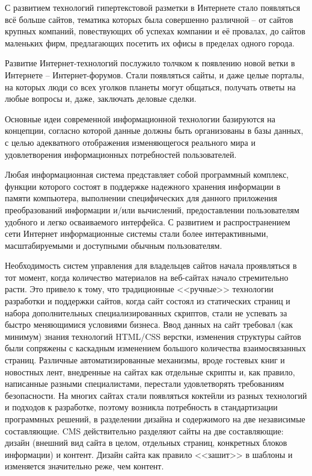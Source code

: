 С развитием технологий гипертекстовой разметки в Интернете стало появляться всё больше сайтов, тематика которых была совершенно различной – от сайтов крупных компаний, повествующих об успехах компании и её провалах, до сайтов маленьких фирм, предлагающих посетить их офисы в пределах одного города.

Развитие Интернет-технологий послужило толчком к появлению новой ветки в Интернете -- Интернет-форумов. Стали появляться сайты, и даже целые порталы, на которых люди со всех уголков планеты могут общаться, получать ответы на любые вопросы и, даже, заключать деловые сделки.

Основные идеи современной информационной технологии базируются на концепции, согласно которой данные должны быть организованы в базы данных, с целью адекватного отображения изменяющегося реального мира и удовлетворения информационных потребностей пользователей.

Любая информационная система представляет собой программный комплекс, функции которого состоят в поддержке надежного хранения информации в памяти компьютера, выполнении специфических для данного приложения преобразований информации и/или вычислений, предоставлении пользователям удобного и легко осваиваемого интерфейса. С развитием и распространением сети Интернет информационные системы стали более интерактивными, масштабируемыми и доступными обычным пользователям.

Необходимость систем управления для владельцев сайтов начала проявляться в тот момент, когда количество материалов на веб-сайтах начало стремительно расти. Это привело к тому, что традиционные <<ручные>> технологии разработки и поддержки сайтов, когда сайт состоял из статических страниц и набора дополнительных специализированных скриптов, стали не успевать за быстро меняющимися условиями бизнеса. Ввод данных на сайт требовал (как минимум) знания технологий HTML/CSS верстки, изменения структуры сайтов были сопряжены с каскадным изменением большого количества взаимосвязанных страниц. Различные автоматизированные механизмы, вроде гостевых книг и новостных лент, внедренные на сайтах как отдельные скрипты и, как правило, написанные разными специалистами, перестали удовлетворять требованиям безопасности. На многих сайтах стали появляться коктейли из разных технологий и подходов к разработке, поэтому возникла потребность в стандартизации программных решений, в разделении дизайна и содержимого на две независимые составляющие. CMS действительно разделяют сайты на две составляющие: дизайн (внешний вид сайта в целом, отдельных страниц, конкретных блоков информации) и контент. Дизайн сайта как правило <<зашит>> в шаблоны и изменяется значительно реже, чем контент.

